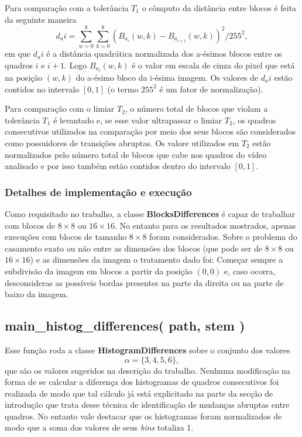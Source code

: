 \documentclass{article}
\begin{document}
Para comparação com a tolerância $T_1$ o cômputo da distância entre blocos é feita da seguinte maneira
\[
d_ai = \sum_{w=0}^{8}\sum_{k=0}^{8}(B_{a_{i}}(w,k) - B_{a_{i+1}}(w,k))^2 / 255^2,
\]
em que $d_ai$ é a distância quadrática normalizada dos a-ésimos blocos entre os quadros $i$ e $i+1$. Logo $B_{a_{i}}(w,k)$ é o valor em escala de cinza do pixel que está na posição $(w,k)$ do a-ésimo bloco da i-ésima imagem. Os valores de $d_ai$ estão contidos no intervalo $[0,1]$ (o termo $255^2$ é um fator de normalização). 

Para comparação com o limiar $T_2$, o número total de blocos que violam a tolerância $T_1$ é levantado e, se esse valor ultrapassar o limiar $T_2$, os quadros consecutivos utilizados na comparação por meio dos seus blocos são considerados como possuidores de transições abruptas. Os valore utilizados em $T_2$ estão normalizados pelo número total de blocos que cabe nos quadros do vídeo analisado e por isso também estão contidos dentro do intervalo $[0,1]$.
%
\subsubsection{Detalhes de implementação e execução}
Como requisitado no trabalho, a classe \textbf{BlocksDifferences} é capaz de trabalhar com blocos de $8\times8$ ou $16\times16$. No entanto para os resultados mostrados, apenas execuções com blocos de tamanho $8\times8$ foram considerados. Sobre o problema do casamento exato ou não entre as dimensões dos blocos (que pode ser de $8\times8$ ou $16\times16$) e as dimensões da imagem o tratamento dado foi: Começar sempre a subdivisão da imagem em blocos a partir da posição $(0,0)$ e, caso ocorra, desconsideras as possíveis bordas presentes na parte da direita ou na parte de baixo da imagem.


%
\subsection{main\_histog\_differences( path, stem )}
Esse função roda a classe \textbf{HistogramDifferences} sobre o conjunto dos valores
\[
\alpha = \{3,4,5,6\},
\]
que são os valores sugeridos na descrição do trabalho. Nenhuma modificação na forma de se calcular a diferença dos histogramas de quadros consecutivos foi realizada de modo que tal cálculo já está explicitado na parte da secção de introdução que trata desse técnica de identificação de mudanças abruptas entre quadros. No entanto vale destacar que os histogramas foram normalizados de modo que a soma dos valores de seus \textit{bins} totaliza 1.
%
\end{document}
